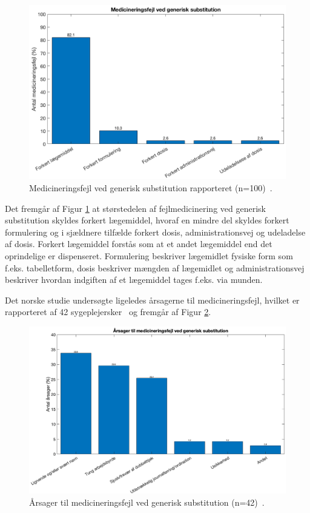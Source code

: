 \begin{figure}[H]\centering	\includegraphics[width=1\textwidth]{billeder/GenSub.png} 
	\caption{Medicineringsfejl ved generisk substitution rapporteret (n=100)~\citep{Hakonsen2010}.}
	\label{fig:GeneriskSubstitution}  
\end{figure}

Det fremgår af Figur \ref{fig:GeneriskSubstitution} at størstedelen af fejlmedicinering ved generisk substitution skyldes forkert lægemiddel, hvoraf en mindre del skyldes forkert formulering og i sjældnere tilfælde forkert dosis, administrationsvej og udeladelse af dosis. Forkert lægemiddel forstås som at et andet lægemiddel end det oprindelige er dispenseret. Formulering beskriver lægemidlet fysiske form som f.eks. tabelletform, dosis beskriver mængden af lægemidlet og administrationsvej beskriver hvordan indgiften af et lægemiddel tages f.eks. via munden.

Det norske studie undersøgte ligeledes årsagerne til medicineringsfejl, hvilket er rapporteret af 42 sygeplejersker~\citep{Hakonsen2010} og fremgår af Figur \ref{fig:GeneriskSubstitution1}.

\begin{figure}[H]\centering	\includegraphics[width=1\textwidth]{billeder/GenSub1.png} 
	\caption{Årsager til medicineringsfejl ved generisk substitution (n=42)~\citep{Hakonsen2010}.}	\label{fig:GeneriskSubstitution1}  
\end{figure}


